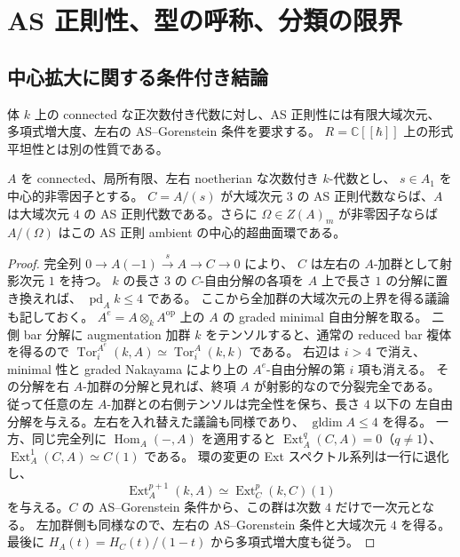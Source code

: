 \section{AS 正則性、型の呼称、分類の限界}
\label{sec:quantization-limits}

\subsection{中心拡大に関する条件付き結論}

体 $k$ 上の connected な正次数付き代数に対し、AS 正則性には有限大域次元、
多項式増大度、左右の AS--Gorenstein 条件を要求する。
$R=\mathbb C[[\hbar]]$ 上の形式平坦性とは別の性質である。

\begin{proposition}[中心拡大]
\label{prop:central-as-extension}
$A$ を connected、局所有限、左右 noetherian な次数付き $k$-代数とし、
$s\in A_1$ を中心的非零因子とする。
$C=A/(s)$ が大域次元 $3$ の AS 正則代数ならば、$A$ は大域次元 $4$ の
AS 正則代数である。さらに $\Omega\in Z(A)_m$ が非零因子ならば
$A/(\Omega)$ はこの AS 正則 ambient の中心的超曲面環である。
\end{proposition}

\begin{proof}
完全列 $0\to A(-1)\xrightarrow{s}A\to C\to0$ により、
$C$ は左右の $A$-加群として射影次元 $1$ を持つ。
$k$ の長さ $3$ の $C$-自由分解の各項を $A$ 上で長さ $1$ の分解に置き換えれば、
$\operatorname{pd}_A k\leq4$ である。
ここから全加群の大域次元の上界を得る議論も記しておく。
$A^e=A\otimes_k A^{\mathrm{op}}$ 上の $A$ の graded minimal 自由分解を取る。
二側 bar 分解に augmentation 加群 $k$ をテンソルすると、通常の reduced bar
複体を得るので
$\operatorname{Tor}^{A^e}_i(k,A)\simeq\operatorname{Tor}^A_i(k,k)$ である。
右辺は $i>4$ で消え、minimal 性と graded Nakayama により上の
$A^e$-自由分解の第 $i$ 項も消える。
その分解を右 $A$-加群の分解と見れば、終項 $A$ が射影的なので分裂完全である。
従って任意の左 $A$-加群との右側テンソルは完全性を保ち、長さ $4$ 以下の
左自由分解を与える。左右を入れ替えた議論も同様であり、
$\operatorname{gldim}A\leq4$ を得る。
一方、同じ完全列に $\operatorname{Hom}_A(-,A)$ を適用すると
$\operatorname{Ext}_A^q(C,A)=0$（$q\ne1$）、
$\operatorname{Ext}_A^1(C,A)\simeq C(1)$ である。
環の変更の Ext スペクトル系列は一行に退化し、
\[
 \operatorname{Ext}_A^{p+1}(k,A)
 \simeq \operatorname{Ext}_C^p(k,C)(1)
\]
を与える。$C$ の AS--Gorenstein 条件から、この群は次数 $4$ だけで一次元となる。
左加群側も同様なので、左右の AS--Gorenstein 条件と大域次元 $4$ を得る。
最後に $H_A(t)=H_C(t)/(1-t)$ から多項式増大度も従う。
\end{proof}

